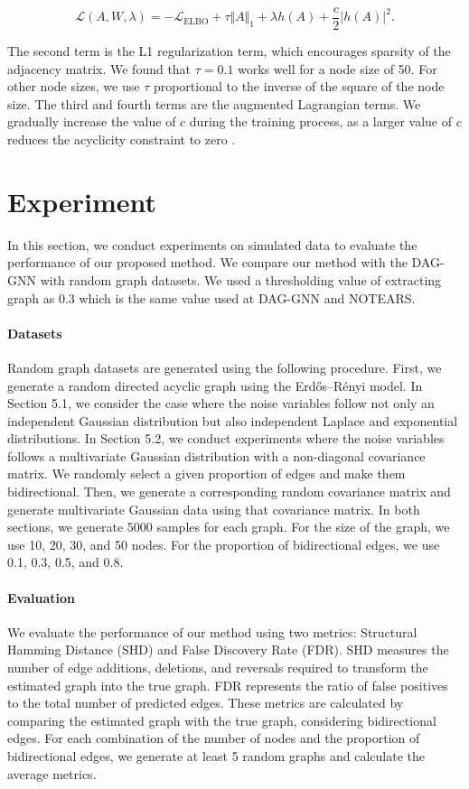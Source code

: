 \documentclass[10pt]{article}
\begin{document}
\begin{equation}
    \mathcal{L}(A, W, \lambda) =-\mathcal{L}_{\mathrm{ELBO}} + \tau \Vert A \Vert_1 + \lambda h(A) + \frac{c}{2} |h(A)|^2.
\end{equation}

The second term is the L1 regularization term, which encourages sparsity of the adjacency matrix. We found that $\tau=0.1$ works well for a node size of 50. For other node sizes, we use $\tau$ proportional to the inverse of the square of the node size. The third and fourth terms are the augmented Lagrangian terms. We gradually increase the value of $c$ during the training process, as a larger value of $c$ reduces the acyclicity constraint to zero \cite{yu2019daggnn}.


\section{Experiment}

In this section, we conduct experiments on simulated data to evaluate the performance of our proposed method. We compare our method with the DAG-GNN \cite{yu2019daggnn} with random graph datasets. We used a thresholding value of extracting graph as 0.3 which is the same value used at DAG-GNN and NOTEARS.\\ 

\paragraph*{Datasets} Random graph datasets are generated using the following procedure. First, we generate a random directed acyclic graph using the Erdős–Rényi model. In Section 5.1, we consider the case where the noise variables follow not only an independent Gaussian distribution but also independent Laplace and exponential distributions. In Section 5.2, we conduct experiments where the noise variables follows a multivariate Gaussian distribution with a non-diagonal covariance matrix. We randomly select a given proportion of edges and make them bidirectional. Then, we generate a corresponding random covariance matrix and generate multivariate Gaussian data using that covariance matrix. In both sections, we generate 5000 samples for each graph. For the size of the graph, we use 10, 20, 30, and 50 nodes. For the proportion of bidirectional edges, we use 0.1, 0.3, 0.5, and 0.8. \\

\paragraph*{Evaluation} We evaluate the performance of our method using two metrics: Structural Hamming Distance (SHD) and False Discovery Rate (FDR). SHD measures the number of edge additions, deletions, and reversals required to transform the estimated graph into the true graph. FDR represents the ratio of false positives to the total number of predicted edges. These metrics are calculated by comparing the estimated graph with the true graph, considering bidirectional edges. For each combination of the number of nodes and the proportion of bidirectional edges, we generate at least 5 random graphs and calculate the average metrics.
\end{document}
